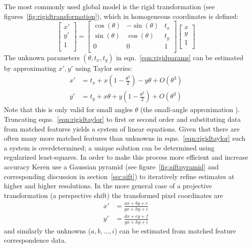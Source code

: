 The most commonly used global model is the rigid transformation (see figures~\ref{fig:rigidtransformation}), which in homogeneous coordinates is defined:
\begin{equation}
	\begin{bmatrix}
		x' \\
		y' \\
		1  \\
	\end{bmatrix} =
	\begin{bmatrix}
		\cos(\theta) & -\sin(\theta) & t_x \\
		\sin(\theta) & \cos(\theta)  & t_y \\
		0            & 0             & 1   \\
	\end{bmatrix}
	\begin{bmatrix}
		x \\
		y \\
		1 \\
	\end{bmatrix}
	\label{eqn:rigidparams}
\end{equation}
The unknown parameters \((\theta, t_x, t_y)\) in eqn.~\eqref{eqn:rigidparams} can be estimated by approximating \(x', y'\) using Taylor series:
\begin{equation}
	\begin{split}
		x' &= t_x + x\left( 1 - \frac{\theta^2}{2} \right) - y\theta  + O(\theta^3) \\
		y' &= t_y + x \theta  + y\left( 1 - \frac{\theta^2}{2} \right) + O(\theta^3)
	\end{split}
	\label{eqn:rigidtaylor}
\end{equation}
Note that this is only valid for small angles \(\theta\) (the small-angle approximation \cite{keren1988}).
%
Truncating eqns.~\eqref{eqn:rigidtaylor} to first or second order and substituting data from matched features yields a system of linear equations.
%
Given that there are often many more matched features than unknowns in eqns.~\eqref{eqn:rigidtaylor} such a system is overdetermined; a unique solution can be determined using regularized least-squares.
%
In order to make this process more efficient and increase accuracy Keren \etal \cite{keren1988} use a Gaussian pyramid (see figure~\ref{fig:siftpyramid} and corresponding discussion in section~\ref{sec:sift}) to iteratively refine estimates at higher and higher resolutions.
%
In the more general case of a projective transformation (a perspective shift) the transformed pixel coordinates are
\begin{equation}
	\begin{split}
		x' & = \frac{ax+by+c}{gx+hy+i} \\
		y' & = \frac{dx+ey+f}{gx+hy+i}
		\label{eqn:projectivetf}
	\end{split}
\end{equation}
and similarly the unknowns (\(a,b,\dots, i\)) can be estimated from matched feature correspondence data.


